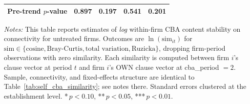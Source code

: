 \begin{table}[H]
\begin{tabular}{lcccc}
Pre-trend $p$-value & 0.897 & 0.197 & 0.541 & 0.201 \\
\hline\hline
\end{tabular}
\begin{minipage}{\linewidth}
\smallskip
\scriptsize\textit{Notes:} This table reports estimates of \emph{log} within-firm CBA content stability on connectivity for untreated firms. Outcomes are $\ln(\text{sim}_{it})$ for $\text{sim} \in \{\text{cosine}, \text{Bray-Curtis}, \text{total variation}, \text{Ruzicka}\}$, dropping firm-period observations with zero similarity. Each similarity is computed between firm $i$'s clause vector at period $t$ and firm $i$'s OWN clause vector at cba\_period $= 2$. Sample, connectivity, and fixed-effects structure are identical to Table~\ref{tab:self_cba_similarity}; see notes there. Standard errors clustered at the establishment level. *\,$p<0.10$, **\,$p<0.05$, ***\,$p<0.01$.
\end{minipage}
\end{table}

